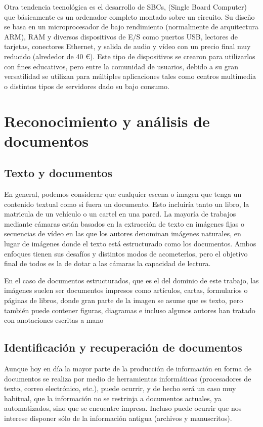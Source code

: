 Otra tendencia tecnológica es el desarrollo de SBCs, (Single Board Computer) que básicamente es un ordenador completo montado sobre un circuito. Su diseño se basa en un microprocesador de bajo rendimiento (normalmente de arquitectura ARM), RAM y diversos dispositivos de E/S como puertos USB, lectores de tarjetas, conectores Ethernet, y salida de audio y vídeo con un precio final muy reducido (alrededor de 40 \euro). Este tipo de dispositivos se crearon para utilizarlos con fines educativos, pero entre la comunidad de usuarios, debido a su gran versatilidad se utilizan para múltiples aplicaciones tales como centros multimedia o distintos tipos de servidores dado su bajo consumo.  

\section{Reconocimiento y análisis de documentos}

\subsection{Texto y documentos}
En general, podemos considerar que cualquier escena o imagen que tenga un contenido textual como si fuera un documento. Esto incluiría tanto un libro, la matricula de un vehículo o un cartel en una pared. La mayoría de trabajos mediante cámaras están basados en la extracción de texto en imágenes fijas o secuencias de vídeo en las que los autores denominan imágenes naturales, en lugar de imágenes donde el texto está estructurado como los documentos. Ambos enfoques tienen sus desafíos y distintos modos de acometerlos, pero el objetivo final de todos es la de dotar a las cámaras la capacidad de lectura.

En el caso de documentos estructurados, que es el del dominio de este trabajo, las imágenes suelen ser documentos impresos como artículos, cartas, formularios o páginas de libros, donde gran parte de la imagen se asume que es texto, pero también puede contener figuras, diagramas e incluso algunos autores han tratado con anotaciones escritas a mano \cite{Chen}

\subsection{Identificación y recuperación de documentos}
Aunque hoy en día la mayor parte de la producción de información en forma de documentos se realiza por medio de herramientas informáticas (procesadores de texto, correo electrónico, etc.), puede ocurrir, y de hecho será un caso muy habitual, que la información no se restrinja a documentos actuales, ya automatizados, sino que se encuentre impresa. Incluso puede ocurrir que nos interese disponer sólo de la información antigua (archivos y manuscritos).


